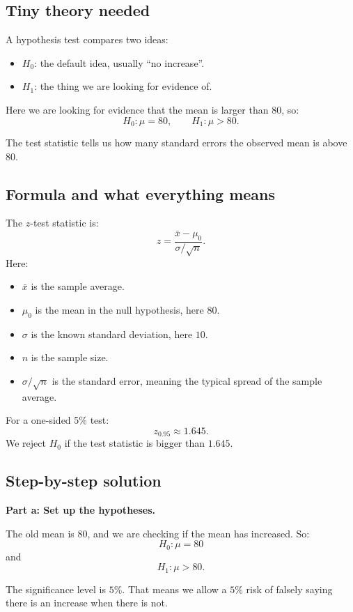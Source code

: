 \documentclass[11pt,a4paper]{article}
\begin{document}
\subsection*{Tiny theory needed}
A hypothesis test compares two ideas:
\begin{itemize}[leftmargin=*]
    \item \(H_0\): the default idea, usually ``no increase''.
    \item \(H_1\): the thing we are looking for evidence of.
\end{itemize}

Here we are looking for evidence that the mean is larger than \(80\), so:
\[
H_0:\mu=80,\qquad H_1:\mu>80.
\]

The test statistic tells us how many standard errors the observed mean is above \(80\).

\subsection*{Formula and what everything means}
The \(z\)-test statistic is:
\[
z=\frac{\bar{x}-\mu_0}{\sigma/\sqrt{n}}.
\]
Here:
\begin{itemize}[leftmargin=*]
    \item \(\bar{x}\) is the sample average.
    \item \(\mu_0\) is the mean in the null hypothesis, here \(80\).
    \item \(\sigma\) is the known standard deviation, here \(10\).
    \item \(n\) is the sample size.
    \item \(\sigma/\sqrt{n}\) is the standard error, meaning the typical spread of the sample average.
\end{itemize}

For a one-sided 5\% test:
\[
z_{0.95}\approx 1.645.
\]
We reject \(H_0\) if the test statistic is bigger than \(1.645\).

\subsection*{Step-by-step solution}
\textbf{Part a: Set up the hypotheses.}

The old mean is \(80\), and we are checking if the mean has increased. So:
\[
H_0:\mu=80
\]
and
\[
H_1:\mu>80.
\]

The significance level is \(5\%\). That means we allow a \(5\%\) risk of falsely saying there is an increase when there is not.
\end{document}
